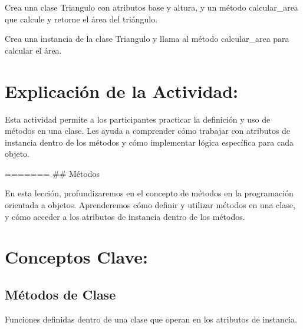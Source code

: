 \documentclass[
  a4paper,
  onepage,
  openany]{scrreprt}
\begin{document}
\begin{tcolorbox}[enhanced jigsaw, breakable, opacityback=0, toptitle=1mm, coltitle=black, toprule=.15mm, rightrule=.15mm, colframe=quarto-callout-important-color-frame, opacitybacktitle=0.6, arc=.35mm, title=\textcolor{quarto-callout-important-color}{\faExclamation}\hspace{0.5em}{Actividad Práctica:}, titlerule=0mm, colbacktitle=quarto-callout-important-color!10!white, bottomtitle=1mm, bottomrule=.15mm, colback=white, left=2mm, leftrule=.75mm]

Crea una clase Triangulo con atributos base y altura, y un método
calcular\_area que calcule y retorne el área del triángulo.

Crea una instancia de la clase Triangulo y llama al método
calcular\_area para calcular el área.

\end{tcolorbox}

\hypertarget{explicaciuxf3n-de-la-actividad-50}{%
\section{Explicación de la
Actividad:}\label{explicaciuxf3n-de-la-actividad-50}}

Esta actividad permite a los participantes practicar la definición y uso
de métodos en una clase. Les ayuda a comprender cómo trabajar con
atributos de instancia dentro de los métodos y cómo implementar lógica
específica para cada objeto.

======= \#\# Métodos

En esta lección, profundizaremos en el concepto de métodos en la
programación orientada a objetos. Aprenderemos cómo definir y utilizar
métodos en una clase, y cómo acceder a los atributos de instancia dentro
de los métodos.

\hypertarget{conceptos-clave-53}{%
\section{Conceptos Clave:}\label{conceptos-clave-53}}

\hypertarget{muxe9todos-de-clase-1}{%
\subsection{Métodos de Clase}\label{muxe9todos-de-clase-1}}

Funciones definidas dentro de una clase que operan en los atributos de
instancia.
\end{document}
